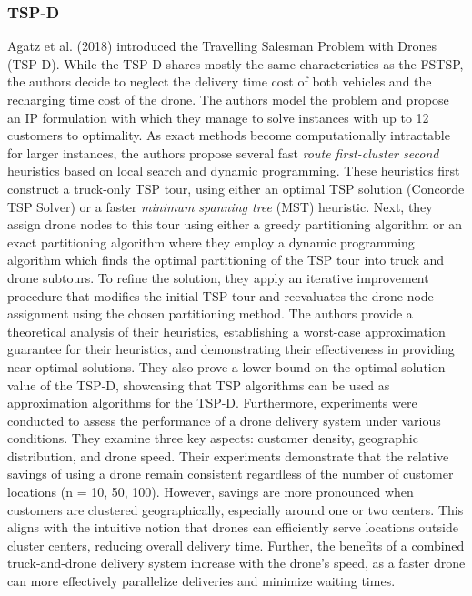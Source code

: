 \documentclass{article}
\begin{document}
	\subsubsection{TSP-D}
	Agatz et al. (2018) introduced the Travelling Salesman Problem with Drones (TSP-D). While the TSP-D shares mostly the same characteristics as the FSTSP, the authors decide to neglect the delivery time cost of both vehicles and the recharging time cost of the drone. The authors model the problem and propose an IP formulation with which they manage to solve instances with up to 12 customers to optimality. As exact methods become computationally intractable for larger instances, the authors propose several fast \textit{route first-cluster second} heuristics based on local search and dynamic programming. These heuristics first construct a truck-only TSP tour, using either an optimal TSP solution (Concorde TSP Solver) or a faster \textit{minimum spanning tree} (MST) heuristic. Next, they assign drone nodes to this tour using either a greedy partitioning algorithm or an exact partitioning algorithm where they employ a dynamic programming algorithm which finds the optimal partitioning of the TSP tour into truck and drone subtours. To refine the solution, they apply an iterative improvement procedure that modifies the initial TSP tour and reevaluates the drone node assignment using the chosen partitioning method. 
	The authors provide a theoretical analysis of their heuristics, establishing a worst-case approximation guarantee for their heuristics, and demonstrating their effectiveness in providing near-optimal solutions. They also prove a lower bound on the optimal solution value of the TSP-D, showcasing that TSP algorithms can be used as approximation algorithms for the TSP-D. Furthermore, experiments were conducted to assess the performance of a drone delivery system under various conditions. They examine three key aspects: customer density, geographic distribution, and drone speed. Their experiments demonstrate that the relative savings of using a drone remain consistent regardless of the number of customer locations (n = 10, 50, 100). However, savings are more pronounced when customers are clustered geographically, especially around one or two centers. This aligns with the intuitive notion that drones can efficiently serve locations outside cluster centers, reducing overall delivery time. Further, the benefits of a combined truck-and-drone delivery system increase with the drone's speed, as a faster drone can more effectively parallelize deliveries and minimize waiting times.
	
\end{document}
